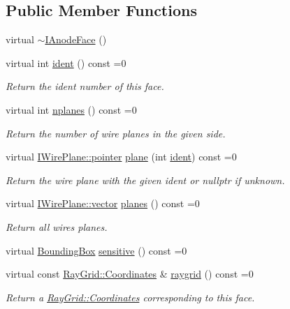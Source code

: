 \subsection*{Public Member Functions}
\begin{DoxyCompactItemize}
\item 
virtual \hyperlink{class_wire_cell_1_1_i_anode_face_a51aff7f109b09620fc5eb6ce5586eb8a}{$\sim$\+I\+Anode\+Face} ()
\item 
virtual int \hyperlink{class_wire_cell_1_1_i_anode_face_a2090bdf3aac37747dcc831ce1529bf53}{ident} () const =0
\begin{DoxyCompactList}\small\item\em Return the ident number of this face. \end{DoxyCompactList}\item 
virtual int \hyperlink{class_wire_cell_1_1_i_anode_face_a5423e72fe99935c08c3076bda3a7354f}{nplanes} () const =0
\begin{DoxyCompactList}\small\item\em Return the number of wire planes in the given side. \end{DoxyCompactList}\item 
virtual \hyperlink{class_wire_cell_1_1_interface_a09c548fb8266cfa39afb2e74a4615c37}{I\+Wire\+Plane\+::pointer} \hyperlink{class_wire_cell_1_1_i_anode_face_a79559335fb83389b656504e480eb2eb7}{plane} (int \hyperlink{class_wire_cell_1_1_i_anode_face_a2090bdf3aac37747dcc831ce1529bf53}{ident}) const =0
\begin{DoxyCompactList}\small\item\em Return the wire plane with the given ident or nullptr if unknown. \end{DoxyCompactList}\item 
virtual \hyperlink{class_wire_cell_1_1_i_component_a18978d88ce697af5941655a89660fd4e}{I\+Wire\+Plane\+::vector} \hyperlink{class_wire_cell_1_1_i_anode_face_ae3ff56137d41a1ab6bf0dfa6892bd293}{planes} () const =0
\begin{DoxyCompactList}\small\item\em Return all wires planes. \end{DoxyCompactList}\item 
virtual \hyperlink{class_wire_cell_1_1_bounding_box}{Bounding\+Box} \hyperlink{class_wire_cell_1_1_i_anode_face_a74d5eec4031d0c78a17cf80d5ccae2cc}{sensitive} () const =0
\item 
virtual const \hyperlink{class_wire_cell_1_1_ray_grid_1_1_coordinates}{Ray\+Grid\+::\+Coordinates} \& \hyperlink{class_wire_cell_1_1_i_anode_face_a4f7bcaa754c5e72535d65568e9cb6c85}{raygrid} () const =0
\begin{DoxyCompactList}\small\item\em Return a \hyperlink{class_wire_cell_1_1_ray_grid_1_1_coordinates}{Ray\+Grid\+::\+Coordinates} corresponding to this face. \end{DoxyCompactList}\end{DoxyCompactItemize}
